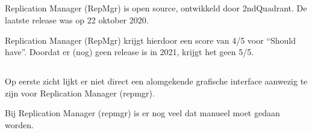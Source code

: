 \subsubsection{}
\label{subsubsec:Failover}

\subsubsection{}
\label{subsubsec:Monitoring}

\subsection{}
\label{subsec:Should have}

Replication Manager (RepMgr) is open source, ontwikkeld door 2ndQuadrant.
De laatste release was op 22 oktober 2020.

Replication Manager (RepMgr) krijgt hierdoor een score van 4/5 voor “Should have”. Doordat er (nog) geen release is in 2021, krijgt het geen 5/5.

\subsubsection{}
\label{subsubsec:Ondersteuning in 2020-2021}

\subsubsection{}
\label{subsubsec:Open source}

\subsection{}
\label{subsec:Could have}

Op eerste zicht lijkt er niet direct een alomgekende grafische interface aanwezig te zijn voor Replication Manager (repmgr).

Bij Replication Manager (repmgr) is er nog veel dat manueel moet gedaan worden.

\subsubsection{}
\label{subsubsec:Grafische interface}

\subsubsection{}
\label{subsubsec:Manuele interventie}
